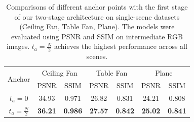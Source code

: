 





\begin{table}[th!]
  \caption{Comparisons of different anchor points with the first stage of our two-stage architecture on single-scene datasets (Ceiling Fan, Table Fan, Plane). The models were evaluated using PSNR and SSIM on intermediate RGB images. $t_a = \frac{N}{2}$ achieves the highest performance across all scenes.}
  \centering
  \setlength{\tabcolsep}{4pt} %
  \begin{tabular}{c c c c c c c}
    \hline
    \multirow{2}{*}{Anchor} & \multicolumn{2}{c}{Ceiling Fan} & \multicolumn{2}{c}{Table Fan} & \multicolumn{2}{c}{Plane} \\
    & PSNR & SSIM & PSNR & SSIM & PSNR & SSIM \\
    \hline
    $t_a=0$ & 34.93 & 0.971 & 26.82 & 0.831 & 24.21 & 0.808 \\
    $t_a=\frac{N}{2}$ & \textbf{36.21} & \textbf{0.986} & \textbf{27.57} & \textbf{0.842} & \textbf{25.02} & \textbf{0.841} \\
    \hline
  \end{tabular}
  \label{table:AnchorPoint_single}
\end{table}



